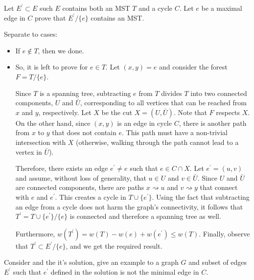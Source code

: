 \begin{problem}
  \label{problem:opkrus}
  Let $E^{\prime} \subset E$ such $E$ contains both an MST $T$ and a cycle $C$. Let $e$ be a maximal edge in $C$ prove that $E^{\prime}/ \{e\}$ contains an MST.  
\end{problem}

\begin{solution} Separate to cases:
  \begin{itemize}
    \item If $e \notin T$, then we done.
    \item So, it is left to prove for $e \in T$. Let $(x,y) = e$ and consider the forest $F = T/\{e\}$.

Since $T$ is a spanning tree, subtracting $e$ from $T$ divides $T$ into two connected components, $U$ and $\bar{U}$, corresponding to all vertices that can be reached from $x$ and $y$, respectively. Let $X$ be the cut $X = (U, \bar{U})$. Note that $F$ respects $X$. On the other hand, since $(x,y)$ is an edge in cycle $C$, there is another path from $x$ to $y$ that does not contain $e$. This path must have a non-trivial intersection with $X$ (otherwise, walking through the path cannot lead to a vertex in $\bar{U}$).

Therefore, there exists an edge $e^{\prime} \neq e$ such that $e \in C \cap X$. Let $e^{\prime} = (u,v)$ and assume, without loss of generality, that $u \in U$ and $v \in \bar{U}$. Since $U$ and $\bar{U}$ are connected components, there are paths $x \rightsquigarrow u$ and $v \rightsquigarrow y$ that connect with $e$ and $e^{\prime}$. This creates a cycle in $T \cup \{e^{\prime}\}$. Using the fact that subtracting an edge from a cycle does not harm the graph's connectivity, it follows that $T^{\prime} = T \cup \{e^{\prime}\} / \{e\}$ is connected and therefore a spanning tree as well.

Furthermore, $w(T^{\prime}) = w(T) - w(e) + w(e^{\prime}) \leq w(T)$. Finally, observe that $T^{\prime} \subset E^{\prime} / \{e\}$, and we get the required result.
  \end{itemize}
\end{solution}


\begin{problem}
  Consider  and the it's solution, give an example to a graph $G$ and subset of edges $E^{\prime}$ such that $e^{\prime}$ defined in the solution is not the minimal edge in $C$. 
\end{problem}

